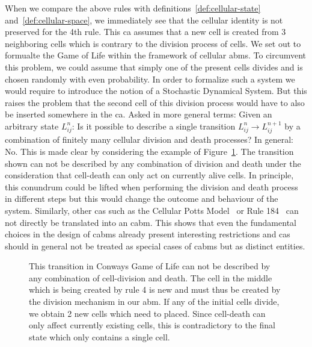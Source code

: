 \documentclass{article}
\begin{document}
When we compare the above rules with definitions~\ref{def:cellular-state}
and~\ref{def:cellular-space}, we immediately see that the cellular identity is not preserved for the
4th rule.
This \ac{ca} assumes that a new cell is created from 3 neighboring cells which is contrary to the
division process of cells.
We set out to formualte the Game of Life within the framework of cellular \acp{abm}.
To circumvent this problem, we could assume that simply one of the present cells divides and is
chosen randomly with even probability.
In order to formalize such a system we would require to introduce the notion of a
Stochastic Dynamical System.
But this raises the problem that the second cell of this division process would have to also be
inserted somewhere in the \ac{ca}.
Asked in more general terms: Given an arbitrary state $L^n_{ij}$:
Is it possible to describe a single transition $L^n_{ij}\rightarrow L^{n+1}_{ij}$ by a combination
of finitely many cellular division and death processes?
In general: No.
This is made clear by considering the example of Figure~\ref{fig:conway-non-abm-transition}.
The transition shown can not be described by any combination of division and death under the
consideration that cell-death can only act on currently alive cells.
In principle, this conundrum could be lifted when performing the division and death process in
different steps but this would change the outcome and behaviour of the system.
Similarly, other \acp{ca} such as the Cellular Potts Model~\cite{Graner1992} or Rule
184~\cite{Krug1988} can not
directly be translated into an \ac{cabm}.
This shows that even the fundamental choices in the design of \acp{cabm} already present interesting
restrictions and \acp{ca} should in general not be treated as special cases of \acp{cabm} but as
distinct entities.

\begin{figure}[h]
    \centering
    \caption{
        This transition in Conways Game of Life can not be described by any combination of
        cell-division and death.
        The cell in the middle which is being created by rule 4 is new and must thus be created by
        the division mechanism in our \ac{abm}.
        If any of the initial cells divide, we obtain 2 new cells which need to placed.
        Since cell-death can only affect currently existing cells, this is contradictory to the
        final state which only contains a single cell.
    }
    \label{fig:conway-non-abm-transition}
\end{figure}
\end{document}
